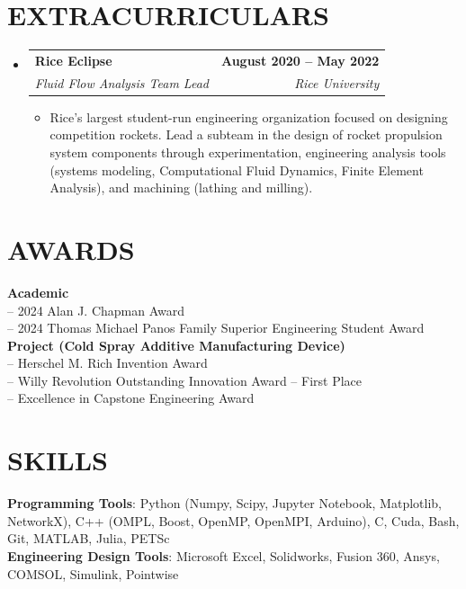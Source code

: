 \documentclass[letterpaper,11pt]{article}
\makeatletter
\newcommand{\resumeItem}[1]{
  \item \small{
    {#1 \vspace{-2pt}}
  }
}
\newcommand{\resumeSubheading}[4]{
  \vspace{-2pt}\item
    \begin{tabular*}{1.0\textwidth}[t]{l@{\extracolsep{\fill}}r}
      \textbf{#1} & \textbf{\small #2} \\
      \textit{\small#3} & \textit{\small #4} \\
    \end{tabular*}\vspace{-7pt}
}
\newcommand{\resumeSubHeadingListStart}{\begin{itemize}[leftmargin=0.0in, label={}]}
\newcommand{\resumeSubHeadingListEnd}{\end{itemize}}
\newcommand{\resumeItemListStart}{\begin{itemize}}
\newcommand{\resumeItemListEnd}{\end{itemize}\vspace{-5pt}}
\makeatother
\begin{document}
\section{EXTRACURRICULARS}
    
    \resumeSubHeadingListStart
        
        \resumeSubheading{Rice Eclipse}{August 2020 -- May 2022}{Fluid Flow Analysis Team Lead}{Rice University}
          \resumeItemListStart
             \resumeItem{Rice's largest student-run engineering organization focused on designing competition rockets. Lead a subteam in the design of rocket propulsion system components through experimentation, engineering analysis tools (systems modeling, Computational Fluid Dynamics, Finite Element Analysis), and machining (lathing and milling).}
          \resumeItemListEnd   
        
    \resumeSubHeadingListEnd
\vspace{-10pt}

\section{AWARDS}
 \begin{itemize}[leftmargin=0.15in, label={}]
    \small{\item{
     \textbf{Academic} \\
     {-- 2024 Alan J. Chapman Award} \\
     {-- 2024 Thomas Michael Panos Family Superior Engineering Student Award} \\
     \vspace{2pt}
     \textbf{Project (Cold Spray Additive Manufacturing Device)} \\
     {-- Herschel M. Rich Invention Award} \\
     {-- Willy Revolution Outstanding Innovation Award -- First Place}\\ 
     {-- Excellence in Capstone Engineering Award} \\
    }}
 \end{itemize}
 \vspace{-10pt}

\section{SKILLS}
 \begin{itemize}[leftmargin=0.15in, label={}]
    \small{\item{
        \textbf{Programming Tools}{: Python (Numpy, Scipy, Jupyter Notebook, Matplotlib, NetworkX), C++ (OMPL, Boost, OpenMP, OpenMPI, Arduino), C, Cuda, Bash, Git, MATLAB, Julia, PETSc} \\
     \textbf{Engineering Design Tools}{: Microsoft Excel, Solidworks, Fusion 360, Ansys, COMSOL, Simulink, Pointwise} \\
    }}
 \end{itemize}
 \vspace{-10pt}
\end{document}
